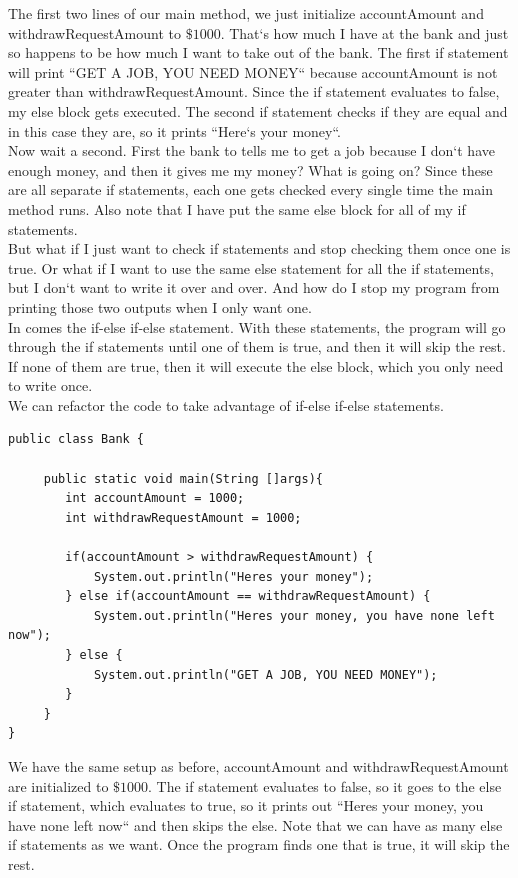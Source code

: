 \documentclass[11]{article}
\begin{document}
The first two lines of our main method, we just initialize accountAmount and withdrawRequestAmount to $\$1000$. That`s how much I have at the bank and just so happens to be how much I want to take out of the bank. The first if statement will print ``GET A JOB, YOU NEED MONEY`` because accountAmount is not greater than withdrawRequestAmount. Since the if statement evaluates to false, my else block gets executed. The second if statement checks if they are equal and in this case they are, so it prints ``Here`s your money``.  \\

Now wait a second. First the bank to tells me to get a job because I don`t have enough money, and then it gives me my money? What is going on? Since these are all separate if statements, each one gets checked every single time the main method runs. Also note that I have put the same else block for all of my if statements.\\

But what if I just want to check if statements and stop checking them once one is true. Or what if I want to use the same else statement for all the if statements, but I don`t want to write it over and over. And how do I stop my program from printing those two outputs when I only want one.\\

In comes the if-else if-else statement. With these statements, the program will go through the if statements until one of them is true, and then it will skip the rest. If none of them are true, then it will execute the else block, which you only need to write once.\\

We can refactor the code to take advantage of if-else if-else statements.
\begin{lstlisting}
public class Bank {

     public static void main(String []args){
        int accountAmount = 1000;
        int withdrawRequestAmount = 1000;
        
        if(accountAmount > withdrawRequestAmount) {
            System.out.println("Heres your money");
        } else if(accountAmount == withdrawRequestAmount) {
            System.out.println("Heres your money, you have none left now");
        } else {
            System.out.println("GET A JOB, YOU NEED MONEY");
        }
     }
}
\end{lstlisting}
We have the same setup as before, accountAmount and withdrawRequestAmount are initialized to $\$1000$.
The if statement evaluates to false, so it goes to the else if statement, which evaluates to true, so it prints out ``Heres your money, you have none left now`` and then skips the else. Note that we can have as many else if statements as we want. Once the program finds one that is true, it will skip the rest.
\end{document}
